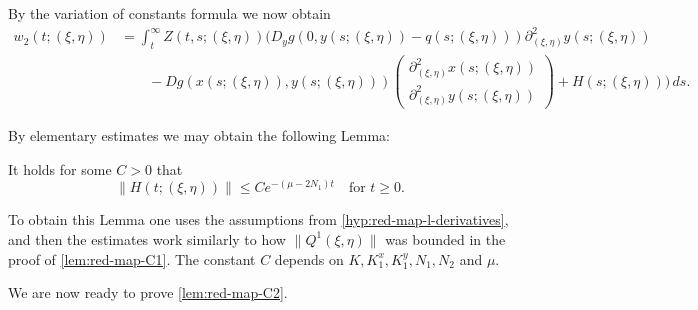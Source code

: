 \documentclass[a4paper]{siamart190516}
\begin{document}
By the variation of constants formula we now obtain
\begin{align*}
w_2(t;(\xi,\eta))  &=  \int_t^{\infty} Z(t,s; (\xi,\eta)) \Bigg( D_y g(0,y(s;(\xi,\eta)) - q(s;(\xi,\eta))) \partial^2_{(\xi,\eta)}y(s; (\xi,\eta))  \\
&\qquad - D g(x(s;(\xi,\eta)),y(s;(\xi,\eta))) \begin{pmatrix} \partial^2_{(\xi,\eta)}x(s; (\xi,\eta)) \\ \partial^2_{(\xi,\eta)}y(s; (\xi,\eta)) \end{pmatrix} + H(s;(\xi,\eta)) \Bigg) \, ds.
\end{align*}

By elementary estimates we may obtain the following Lemma:
\begin{lemma}
It holds for some $C>0$ that
\[
\| H(t; (\xi,\eta)) \|  \leq C e^{-(\mu - 2 N_1) t} \quad \text{for } t \geq 0.
\]
\end{lemma}
To obtain this Lemma one uses the assumptions from \cref{hyp:red-map-l-derivatives}, and then the estimates work similarly to how 
$\|Q^1(\xi,\eta)\|$ was bounded in the proof of \cref{lem:red-map-C1}. The constant $C$ depends on $K, K_1^x, K_1^y, N_1, N_2$ and $\mu$.



We are now ready to prove \cref{lem:red-map-C2}.
\end{document}
